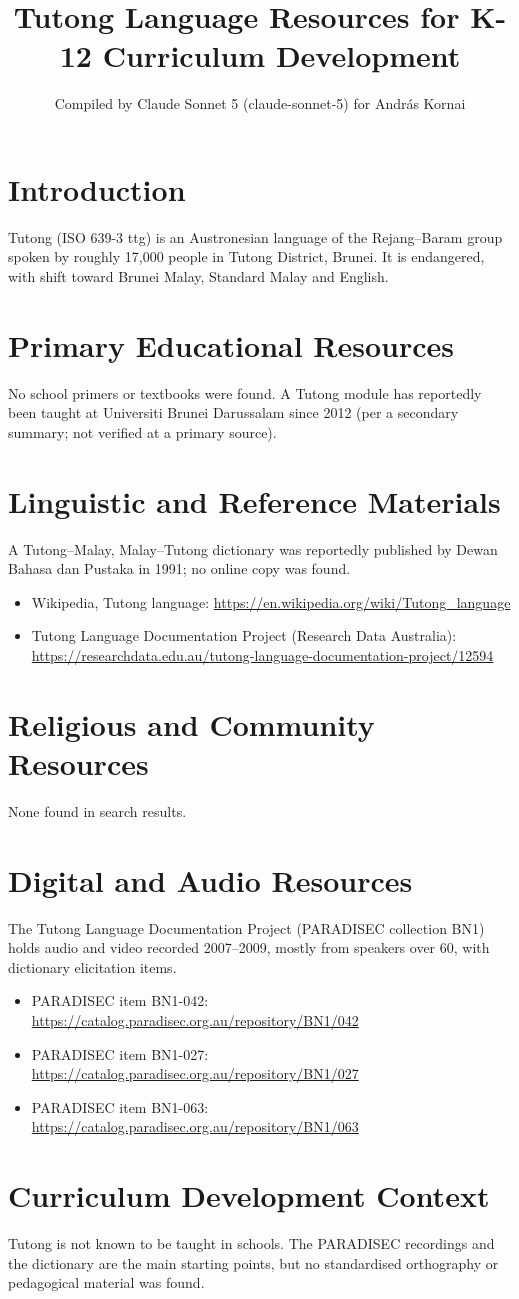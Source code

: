 \documentclass[12pt]{article}
\title{Tutong Language Resources for K-12 Curriculum Development}
\author{Compiled by Claude Sonnet 5 (claude-sonnet-5) for Andr\'as Kornai}
\date{}
\begin{document}
\maketitle
\section{Introduction}
Tutong (ISO 639-3 ttg) is an Austronesian language of the Rejang--Baram group spoken by roughly 17,000 people in Tutong District, Brunei. It is endangered, with shift toward Brunei Malay, Standard Malay and English.
\section{Primary Educational Resources}
No school primers or textbooks were found. A Tutong module has reportedly been taught at Universiti Brunei Darussalam since 2012 (per a secondary summary; not verified at a primary source).
\section{Linguistic and Reference Materials}
A Tutong--Malay, Malay--Tutong dictionary was reportedly published by Dewan Bahasa dan Pustaka in 1991; no online copy was found.
\begin{itemize}
\item Wikipedia, Tutong language: \url{https://en.wikipedia.org/wiki/Tutong_language}
\item Tutong Language Documentation Project (Research Data Australia): \url{https://researchdata.edu.au/tutong-language-documentation-project/12594}
\end{itemize}
\section{Religious and Community Resources}
None found in search results.
\section{Digital and Audio Resources}
The Tutong Language Documentation Project (PARADISEC collection BN1) holds audio and video recorded 2007--2009, mostly from speakers over 60, with dictionary elicitation items.
\begin{itemize}
\item PARADISEC item BN1-042: \url{https://catalog.paradisec.org.au/repository/BN1/042}
\item PARADISEC item BN1-027: \url{https://catalog.paradisec.org.au/repository/BN1/027}
\item PARADISEC item BN1-063: \url{https://catalog.paradisec.org.au/repository/BN1/063}
\end{itemize}
\section{Curriculum Development Context}
Tutong is not known to be taught in schools. The PARADISEC recordings and the dictionary are the main starting points, but no standardised orthography or pedagogical material was found.
\end{document}
